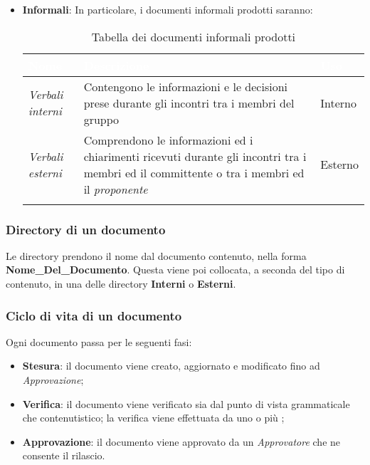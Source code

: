 \begin{itemize}
{\begin{longtable}{C{.24\freewidth} C{.58\freewidth} C{.12\freewidth}}
				\end{longtable}
			}
			\item \textbf{Informali}: 
			In particolare, i documenti informali prodotti saranno:
			{
				\setlength{\freewidth}{\dimexpr\textwidth-1\tabcolsep}
				\renewcommand{\arraystretch}{1.5}
				\centering
				\setlength{\aboverulesep}{0pt}
				\setlength{\belowrulesep}{0pt}
				\begin{longtable}{C{.24\freewidth} C{.58\freewidth} C{.12\freewidth}}
					\toprule
					\textcolor{white}{\textbf{Nome}}&
					\textcolor{white}{\textbf{Descrizione}}&
					\textcolor{white}{\textbf{Uso}}\\	
					\toprule
					\endhead
					\emph{Verbali interni} & Contengono le informazioni e le decisioni prese durante gli incontri tra i membri del gruppo & Interno \\	
					\emph{Verbali esterni} & Comprendono le informazioni ed i chiarimenti ricevuti durante gli incontri tra i membri ed il committente o tra i membri ed il \emph{proponente} & Esterno \\
					\bottomrule
					\caption{Tabella dei documenti informali prodotti}
				\end{longtable}
			}
		\end{itemize}
	
	\subsubsection{Directory di un documento}
	Le directory prendono il nome dal documento contenuto, nella forma \textbf{Nome\_Del\_Documento}. Questa viene poi collocata, a seconda del tipo di contenuto, in una delle directory \textbf{Interni} o \textbf{Esterni}. 
	
	\subsubsection{Ciclo di vita di un documento}
		Ogni documento passa per le seguenti fasi:
			\begin{itemize}
				\item \textbf{Stesura}: il documento viene creato, aggiornato e modificato fino ad \emph{Approvazione};
				\item  \textbf{Verifica}: il documento viene verificato sia dal punto di vista grammaticale che contenutistico; la verifica viene effettuata da uno o più \verf{};
				\item \textbf{Approvazione}: il documento viene approvato da un \emph{Approvatore} che ne consente il rilascio.
			\end{itemize}
